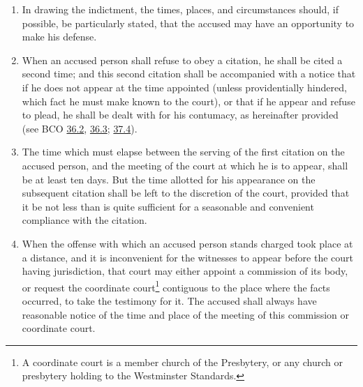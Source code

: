 \documentclass[
]{book}
\begin{document}
\begin{enumerate}
\item
  In drawing the indictment, the times, places, and circumstances should, if possible, be particularly stated, that the accused may have an opportunity to make his defense.
\item
  When an accused person shall refuse to obey a citation, he shall be cited a second time; and this second citation shall be accompanied with a notice that if he does not appear at the time appointed (unless providentially hindered, which fact he must make known to the court), or that if he appear and refuse to plead, he shall be dealt with for his contumacy, as hereinafter provided (see BCO \protect\hyperlink{36.2}{36.2}, \protect\hyperlink{36.3}{36.3}; \protect\hyperlink{37.4}{37.4}).
\item
  The time which must elapse between the serving of the first citation on the accused person, and the meeting of the court at which he is to appear, shall be at least ten days. But the time allotted for his appearance on the subsequent citation shall be left to the discretion of the court, provided that it be not less than is quite sufficient for a seasonable and convenient compliance with the citation.
\item
  \protect\hypertarget{35.8}{\href{}{}}When the offense with which an accused person stands charged took place at a distance, and it is inconvenient for the witnesses to appear before the court having jurisdiction, that court may either appoint a commission of its body, or request the coordinate court\footnote{A coordinate court is a member church of the Presbytery, or any church or presbytery holding to the Westminster Standards.} contiguous to the place where the facts occurred, to take the testimony for it. The accused shall always have reasonable notice of the time and place of the meeting of this commission or coordinate court.
\end{enumerate}
\end{document}
